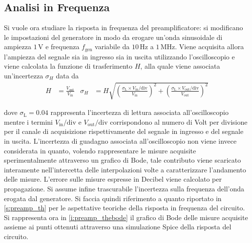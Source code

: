 \documentclass[a4paper,11pt]{article} %
\begin{document}

\subsection{Analisi in Frequenza}\label{s:preamp_bode}

Si vuole ora studiare la risposta in frequenza del preamplificatore: si modificano le impostazioni del generatore in
modo da erogare un'onda sinusoidale di ampiezza $1\,\si{\volt}$ e frequenza $f_{\text{gen}}$ variabile da $10\,\si{\Hz}$
a $1\,\si{\MHz}$. Viene acquisita allora l'ampiezza del segnale sia in ingresso sia in uscita utilizzando
l'oscilloscopio e viene calcolata la funzione di trasferimento $H$, alla quale viene associata un'incertezza
$\sigma_{H}$ data da
\begin{align}\label{e:preamp_H_err}
	H&=\frac{V_{\text{out}}}{V_{\text{in}}} & 
	\sigma_{H}&= H \sqrt{	
						\left(	\frac{	\sigma_{\text{L}}\times V_{\text{in}}/\text{div}	}{	V_{\text{in}}	}	\right)^2	 + 
						\left(	\frac{	\sigma_{\text{L}}\times V_{\text{out}}/\text{div}	}{	V_{\text{out}}	}	\right)^2 }
\end{align}

dove $\sigma_{\text{L}}=0.04$ rappresenta l'incertezza di lettura associata all'oscilloscopio mentre i termini
$V_{\text{in}}/\text{div}$ e $V_{\text{out}}/\text{div}$ corrispondono al numero di Volt per divisione per il canale di
acquisizione rispettivamente del segnale in ingresso e del segnale in uscita. L'incertezza di guadagno associata
all'oscilloscopio non viene invece considerata in quanto, volendo rappresentare le misure acquisite sperimentalmente
attraverso un grafico di Bode, tale contributo viene scaricato interamente nell'intercetta delle interpolazioni volte a
caratterizzare l'andamento delle misure. L'errore sulle misure espresse in Decibel viene calcolato per propagazione. Si
assume infine trascurabile l'incertezza sulla frequenza dell'onda erogata dal generatore. Si faccia quindi riferimento a
quanto riportato in \autoref{s:preamp_th} per le aspettative teoriche della risposta in frequenza del circuito. Si
rappresenta ora in \autoref{i:preamp_thebode} il grafico di Bode delle misure acquisite assieme ai punti ottenuti
attraverso una simulazione Spice della risposta del circuito.
\end{document}
